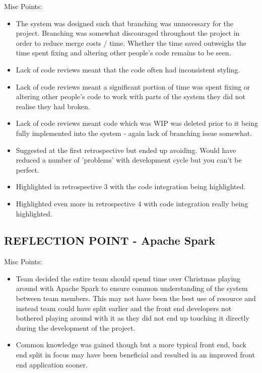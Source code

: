 \documentclass{l3proj}
\begin{document}
Misc Points:
\begin{itemize}
\item The system was designed such that branching was unnecessary for the project. Branching was somewhat discouraged throughout the project in order to reduce merge costs / time. Whether the time saved outweighs the time spent fixing and altering other people’s code remains to be seen.
\item Lack of code reviews meant that the code often had inconsistent styling.
\item Lack of code reviews meant a significant portion of time was spent fixing or altering other people's code to work with parts of the system they did not realise they had broken.
\item Lack of code reviews meant code which was WIP was deleted prior to it being fully implemented into the system - again lack of branching issue somewhat.
\item Suggested at the first retrospective but ended up avoiding. Would have reduced a number of 'problems' with development cycle but you can't be perfect.
\item Highlighted in retrospective 3 with the code integration being highlighted.
\item Highlighted even more in retrospective 4 with code integration really being highlighted.
\end{itemize}


\subsection{REFLECTION POINT - Apache Spark}
\label{sec:sparkreflection}
Misc Points:
\begin{itemize}
\item Team decided the entire team should spend time over Christmas playing around with Apache Spark to ensure common understanding of the system between team members. This may not have been the best use of resource and instead team could have split earlier and the front end developers not bothered playing around with it as they did not end up touching it directly during the development of the project. 
\item Common knowledge was gained though but a more typical front end, back end split in focus may have been beneficial and resulted in an improved front end application sooner.
\end{itemize}
\end{document}
